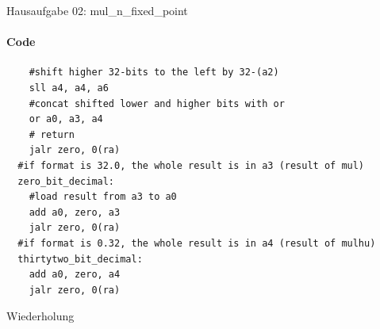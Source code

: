 \documentclass[
  german,            %
  aspectratio=169,    %
]{tumbeamer}
\begin{document}
\begin{frame}[fragile]{Hausaufgabe 02: mul\_n\_fixed\_point}
  \framesubtitle{Code}
  \begin{lstlisting}
    #shift higher 32-bits to the left by 32-(a2)
    sll a4, a4, a6
    #concat shifted lower and higher bits with or
    or a0, a3, a4
    # return
    jalr zero, 0(ra)
  #if format is 32.0, the whole result is in a3 (result of mul)
  zero_bit_decimal:
    #load result from a3 to a0
    add a0, zero, a3
    jalr zero, 0(ra)
  #if format is 0.32, the whole result is in a4 (result of mulhu)
  thirtytwo_bit_decimal:
    add a0, zero, a4
    jalr zero, 0(ra)
  \end{lstlisting}
\end{frame}

\begin{frame}[c]{}{}
  \begin{center}
    \LARGE  Wiederholung
  \end{center}
\end{frame}
\end{document}

